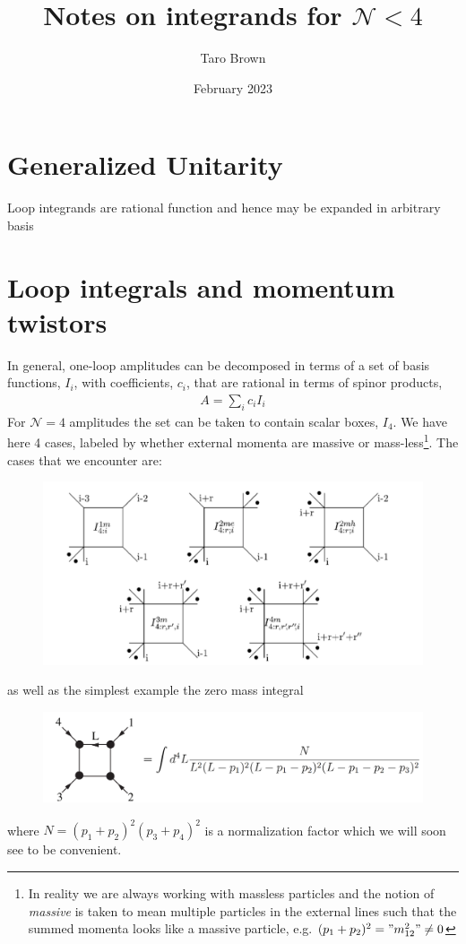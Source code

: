 \documentclass[letter,12pt]{article}
\title{Notes on integrands for $\mathcal{N}<4$}
\author{Taro Brown}
\date{February 2023}
\begin{document}
\maketitle

\section{Generalized Unitarity}
Loop integrands are rational function and hence may be expanded in arbitrary basis

\section{Loop integrals and momentum twistors}
In general, one-loop amplitudes can be decomposed in terms of a set of basis functions, $I_i$, with coefficients, $c_i$, that are rational in terms of spinor products,
\begin{equation}
	\begin{aligned}
		A= \sum_i c_i I_i
	\end{aligned}
\end{equation}
For $\mathcal{N} = 4$ amplitudes the set can be taken to contain scalar boxes, $I_4$. We have here 4 cases, labeled by whether external momenta are massive or mass-less\footnote{In reality we are always working with massless particles and the notion of \textit{massive} is taken to mean multiple particles in the external lines such that the summed momenta looks like a massive particle, e.g. $(p_1+p_2)^2="m_{12}^2"\neq0$}. The cases that we encounter are:
\begin{figure}[H]
	\centering
	\includegraphics[width=0.8\linewidth]{box-types}
	\caption{}
	\label{fig:box-types}
\end{figure}
as well as the simplest example the zero mass integral
 \begin{figure}[H]
 	\centering
 	\includegraphics[width=0.9\linewidth]{zeromass}
 	\caption{}
 	\label{fig:zeromass}
 \end{figure}
where $N=(p_1+p_2)^2(p_3+p_4)^2$ is a normalization factor which we will soon see to be convenient.
\end{document}
